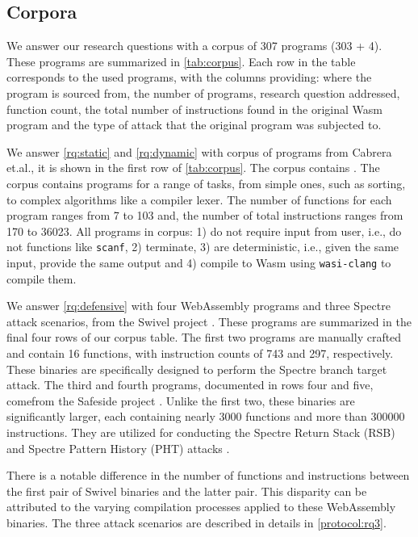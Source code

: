 \documentclass[sigplan,screen]{acmart}
\newcommand{\wasm}{Wasm\xspace}
\newcommand{\Wasm}{WebAssembly\xspace}
\newcommand{\etal}{et.al.\xspace}
\newcommand{\ie}{i.e.,\xspace}
\begin{document}
\subsection{Corpora}
\label{sec:corpus}



We answer our research questions with a corpus of 307 programs (303 + 4).
These programs are summarized in \autoref{tab:corpus}.
Each row in the table corresponds to the used programs, with the columns providing: where the program is sourced from, the number of programs, research question addressed, function count, the total number of instructions found in the original \wasm program and the type of attack that the original program was subjected to.

We answer \ref{rq:static} and \ref{rq:dynamic} with corpus of programs from Cabrera \etal \cite{arteaga2020crow}, it is shown in the first row of \autoref{tab:corpus}.
The corpus contains \nProgramsRosetta.
The corpus contains programs for a range of tasks, from simple ones, such as sorting, to complex algorithms like a compiler lexer. 
The number of functions for each program ranges from 7 to 103 and, the number of total instructions ranges from 170 to 36023.
All programs in corpus: 
1) do not require input from user, \ie do not  functions like \texttt{scanf}, 2) terminate, 3) are deterministic, \ie given the same input, provide the same output and 4) compile to \wasm using \texttt{wasi-clang} to compile them.

We answer \ref{rq:defensive} with four \Wasm programs and three Spectre attack scenarios, from the Swivel project \cite{Swivel}. 
These programs are summarized in the final four rows of our corpus table.
The first two programs are manually crafted and contain 16 functions, with instruction counts of 743 and 297, respectively. These binaries are specifically designed to perform the Spectre branch target attack.
The third and fourth programs, documented in rows four and five, comefrom the Safeside project \cite{safeside}. 
Unlike the first two, these binaries are significantly larger, each containing nearly 3000 functions and more than 300000 instructions. 
They are utilized for conducting the Spectre Return Stack (RSB) and Spectre Pattern History (PHT) attacks \cite{Spectre}.

There is a notable difference in the number of functions and instructions between the first pair of Swivel binaries and the latter pair. 
This disparity can be attributed to the varying compilation processes applied to these \Wasm binaries. 
The three attack scenarios are described in details in \autoref{protocol:rq3}.
\end{document}
